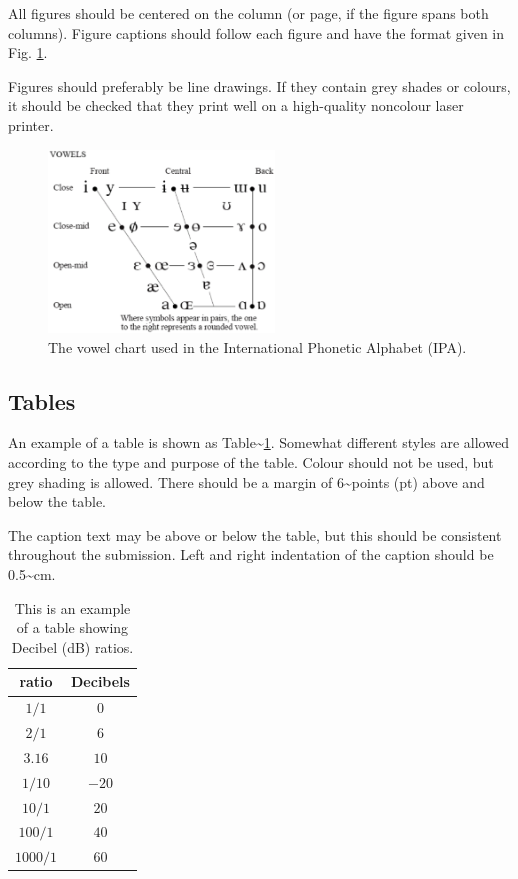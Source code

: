 \documentclass[
  a4paper,
  11pt,
  twocolumn]{article}
\begin{document}
All figures should be centered on the column (or page, if the figure
spans both columns). Figure captions should follow each figure and have
the format given in Fig. \ref{fig:vowels}.

Figures should preferably be line drawings. If they contain grey shades
or colours, it should be checked that they print well on a high-quality
noncolour laser printer.

\begin{figure}[!ht]
\begin{center}
\includegraphics[width=6cm]{./includes/figures/ipa.eps}
\caption{The vowel chart used in the International Phonetic
Alphabet (IPA).}\label{fig:vowels}
\end{center}
\end{figure}

\subsection{Tables}

An example of a table is shown as
Table\textasciitilde{}\ref{tab:decibel}. Somewhat different styles are
allowed according to the type and purpose of the table. Colour should
not be used, but grey shading is allowed. There should be a margin of
6\textasciitilde points (pt) above and below the table.

The caption text may be above or below the table, but this should be
consistent throughout the submission. Left and right indentation of the
caption should be 0.5\textasciitilde cm.

\begin{table}[!ht]
  \begin{center}
  \begin{tabular}{|c|c|}
  \hline
  \rowcolor[gray]{.75}
  ratio    & Decibels\\
  \hline
  $1/1$    & $0$\\
  $2/1$    & $6$\\
  $3.16$   & $10$\\
  $1/10$   & $-20$\\
  $10/1$   & $20$\\
  $100/1$  & $40$\\
  $1000/1$ & $60$\\
  \hline
  \end{tabular}
  \caption{This is an example of a table showing Decibel (dB)
  ratios.}\label{tab:decibel}
  \end{center}
\end{table}
\end{document}
